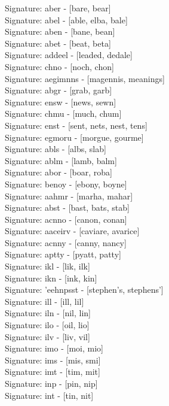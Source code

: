 Signature: {aber} - [bare, bear] \\
Signature: {abel} - [able, elba, bale] \\
Signature: {aben} - [bane, bean] \\
Signature: {abet} - [beat, beta] \\
Signature: {addeel} - [leaded, dedale] \\
Signature: {chno} - [noch, chon] \\
Signature: {aegimnns} - [magennis, meanings] \\
Signature: {abgr} - [grab, garb] \\
Signature: {ensw} - [news, sewn] \\
Signature: {chmu} - [much, chum] \\
Signature: {enst} - [sent, nets, nest, tens] \\
Signature: {egmoru} - [morgue, gourme] \\
Signature: {abls} - [albs, slab] \\
Signature: {ablm} - [lamb, balm] \\
Signature: {abor} - [boar, roba] \\
Signature: {benoy} - [ebony, boyne] \\
Signature: {aahmr} - [marha, mahar] \\
Signature: {abst} - [bast, bats, stab] \\
Signature: {acnno} - [canon, conan] \\
Signature: {aaceirv} - [caviare, avarice] \\
Signature: {acnny} - [canny, nancy] \\
Signature: {aptty} - [pyatt, patty] \\
Signature: {ikl} - [lik, ilk] \\
Signature: {ikn} - [ink, kin] \\
Signature: {'eehnpsst} - [stephen's, stephens'] \\
Signature: {ill} - [ill, lil] \\
Signature: {iln} - [nil, lin] \\
Signature: {ilo} - [oil, lio] \\
Signature: {ilv} - [liv, vil] \\
Signature: {imo} - [moi, mio] \\
Signature: {ims} - [mis, smi] \\
Signature: {imt} - [tim, mit] \\
Signature: {inp} - [pin, nip] \\
Signature: {int} - [tin, nit] \\
